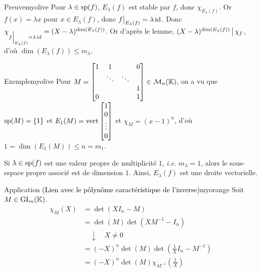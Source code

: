     \begin{demo}{Preuve}{myolive}
        Pour $\lambda \in \sp(f)$, $E_{\lambda}(f)$ est stable par $f$, donc $\chi_{E_{\lambda}(f)}$. Or $f(x) = \lambda x$ pour $x \in E_{\lambda}(f)$, donc $\restr{f}{E_{\lambda}(f)} = \lambda \id$. Donc $\chi_{\restr{f}{E_{\lambda}(f)} = \lambda \id} = (X - \lambda)^{\dim(E_{\lambda}(f))}$. Or d’après le lemme, $(X - \lambda)^{\dim(E_{\lambda}(f))} \vbar \chi_{f}$, d’où $\dim(E_{\lambda}(f)) \leq m_{\lambda}$.
    \end{demo}

    \begin{omed}{Exemple}{myolive}
        Pour $M = \begin{bmatrix}
                1 & 1 & & 0 \\
                 & \ddots & \ddots & \\
                 & & & 1 \\
                0 & & & 1
            \end{bmatrix} \in \mk{n}$, on a vu que $\sp(M) = \left\{1\right\}$ et $E_1(M) = \vect\begin{bmatrix}
                1 \\
                0 \\
                \vdots \\
                0
            \end{bmatrix}$ et $\chi_M = (x-1)^n$, d’où $1 = \dim(E_1(M)) \leq n = m_1$.
    \end{omed}

    \begin{coro}{}{}
        Si $\lambda \in \sp(f)$ est une valeur propre de multiplicité $1$, \textit{i.e.} $m_{\lambda} = 1$, alors le sous-espace propre associé est de dimension $1$. Ainsi, $E_{\lambda}(f)$ est une droite vectorielle.
    \end{coro}

    \begin{omed}{Application \textcolor{black}{(Lien avec le pôlynôme caractéristique de l’inverse)}}{myorange}
        Soit $M \in \GL_n(\mathbb{K})$. 
        \begin{align*}
            \chi_M(X) 
            &= \det(X I_n - M) \\
            &= \det(M)\det(X M^{-1} - I_n) \\ 
            &\quad \downarrow \quad X \neq 0 \\
            &= (- X)^n \det(M) \det(\frac{1}{X} I_n - M^{-1}) \\
            &= (- X)^n \det(M) \chi_{M^{-1}}\left(\frac{1}{X}\right)
        \end{align*}
    \end{omed}

